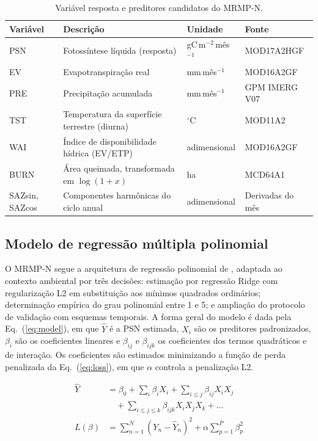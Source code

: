 \documentclass[a4paper,fleqn]{cas-dc}
\begin{document}
\begin{table}[htbp]
\caption{Variável resposta e preditores candidatos do MRMP-N.}\label{tbl:vars}
\begin{tabular*}{\tblwidth}{@{}LLLL@{}}
\toprule
Variável & Descrição & Unidade & Fonte \\
\midrule
PSN & Fotossíntese líquida (resposta) & gC\,m$^{-2}$\,mês$^{-1}$ & MOD17A2HGF \\
EV & Evapotranspiração real & mm\,mês$^{-1}$ & MOD16A2GF \\
PRE & Precipitação acumulada & mm\,mês$^{-1}$ & GPM IMERG V07 \\
TST & Temperatura da superfície terrestre (diurna) & $^\circ$C & MOD11A2 \\
WAI & Índice de disponibilidade hídrica (EV/ETP) & adimensional & MOD16A2GF \\
BURN & Área queimada, transformada em $\log(1+x)$ & ha & MCD64A1 \\
SAZsin, SAZcos & Componentes harmônicas do ciclo anual & adimensional & Derivadas do mês \\
\bottomrule
\end{tabular*}
\end{table}

\subsection{Modelo de regressão múltipla polinomial}

O MRMP-N segue a arquitetura de regressão polinomial de \citet{guimaraes2024}, adaptada ao contexto ambiental por três decisões: estimação por regressão Ridge com regularização L2 em substituição aos mínimos quadrados ordinários; determinação empírica do grau polinomial entre 1 e 5; e ampliação do protocolo de validação com esquemas temporais. A forma geral do modelo é dada pela Eq.~(\ref{eq:model}), em que $\hat{Y}$ é a PSN estimada, $X_i$ são os preditores padronizados, $\beta_i$ são os coeficientes lineares e $\beta_{ij}$ e $\beta_{ijk}$ os coeficientes dos termos quadráticos e de interação. Os coeficientes são estimados minimizando a função de perda penalizada da Eq.~(\ref{eq:loss}), em que $\alpha$ controla a penalização L2.
\noindent\begin{minipage}{\columnwidth}
\begin{align}
\hat{Y} &= \beta_0 + \sum_i \beta_i X_i + \sum_{i \le j} \beta_{ij} X_i X_j \nonumber\\
        &\quad + \sum_{i \le j \le k} \beta_{ijk} X_i X_j X_k + \dots \label{eq:model}\\
L(\beta) &= \sum_{n=1}^{N} \left(Y_n - \hat{Y}_n\right)^2 + \alpha \sum_{p=1}^{P} \beta_p^2 \label{eq:loss}
\end{align}
\end{minipage}
\vspace{0.5\baselineskip}
\end{document}
